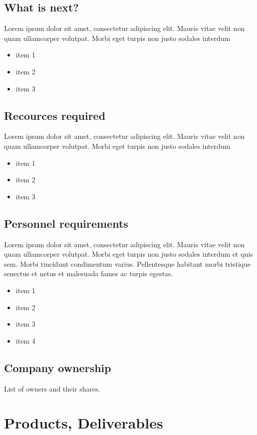 \documentclass[11pt]{article}
\begin{document}
\subsection{What is next?}
Lorem ipsum dolor sit amet, consectetur adipiscing elit. Mauris vitae velit 
non quam ullamcorper volutpat. Morbi eget turpis non justo sodales interdum
\newline
\begin{itemize}
\item item 1
\item item 2
\item item 3
\end{itemize}
 
\subsection{Recources required}
Lorem ipsum dolor sit amet, consectetur adipiscing elit. Mauris vitae velit 
non quam ullamcorper volutpat. Morbi eget turpis non justo sodales interdum
\newline
\begin{itemize}
\item item 1
\item item 2
\item item 3
\end{itemize}

\subsection{Personnel requirements}
Lorem ipsum dolor sit amet, consectetur adipiscing elit. Mauris vitae velit 
non quam ullamcorper volutpat. Morbi eget turpis non justo sodales interdum 
et quis sem. Morbi tincidunt condimentum varius. Pellentesque habitant morbi 
tristique senectus et netus et malesuada fames ac turpis egestas.\newline
\begin{itemize}
\item item 1
\item item 2
\item item 3
\item item 4
\end{itemize}

\subsection{Company ownership}
List of owners and their shares.
\pagebreak


\section{Products, Deliverables}
\end{document}
